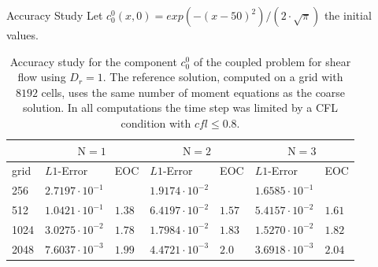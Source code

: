 \begin{frame}{Accuracy Study}
\scriptsize
Let  $c^0_0(x,0) = exp(-(x-50)^2)/(2 \cdot \sqrt{\pi})$ the initial values.
\vspace{5mm}
\begin{table}[ht]
	\centering
	\begin{tabular}{|l|l|l|l|l|l|l|}
		\hline 
		& \multicolumn{2}{|c|}{$\mathrm{N}=1$} & \multicolumn{2}{|c|}{$\mathrm{N}=2$} & \multicolumn{2}{|c|}{$\mathrm{N}=3$} \\
		\hline 
		grid & $L1$-Error & EOC  & $L1$-Error & EOC  & $L1$-Error & EOC  \\
		\hline
		256 & $2.7197  \cdot 10^{-1}$ & & $1.9174\cdot 10^{-2}$&&$1.6585 \cdot 10^{-1}$&\\
		\hline
		512 & $1.0421 \cdot 10^{-1}$ &$1.38$ & $6.4197 \cdot 10^{-2}$&$1.57$&$ 5.4157 \cdot 10^{-2}$&$1.61$\\
		\hline 
		1024  &$3.0275 \cdot 10^{-2}$&$1.78$& $1.7984 \cdot 10^{-2}$&$1.83$&$ 1.5270 \cdot 10^{-2}$& $1.82$\\
		\hline
		2048 & $ 7.6037 \cdot 10^{-3}$ &$1.99$& $4.4721 \cdot 10^{-3}$&$2.0$&$3.6918 \cdot 10^{-3}$&$2.04$\\
		\hline
	\end{tabular}
	\caption{Accuracy study for the component $c^0_0$ of the coupled problem for shear flow using $D_r=1$. The reference solution, computed on a grid with $8192$ cells, uses the same number of moment equations as the coarse solution.  In all computations the time step was limited by a CFL condition with $cfl \leq 0.8$.}
	\label{tab:Dr=1_error_N=1,2,3vsN=1,2,3}
\end{table}
\end{frame}



